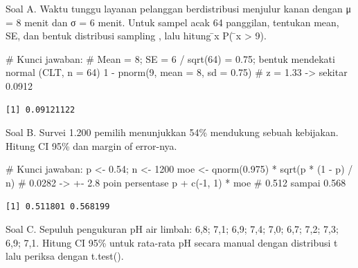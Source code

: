 \documentclass[
  indonesian,
  letterpaper,
]{book}
\newenvironment{Shaded}{\begin{snugshade}}{\end{snugshade}}
\newcommand{\AttributeTok}[1]{\textcolor[rgb]{0.40,0.45,0.13}{#1}}
\newcommand{\CommentTok}[1]{\textcolor[rgb]{0.37,0.37,0.37}{#1}}
\newcommand{\DecValTok}[1]{\textcolor[rgb]{0.68,0.00,0.00}{#1}}
\newcommand{\FloatTok}[1]{\textcolor[rgb]{0.68,0.00,0.00}{#1}}
\newcommand{\FunctionTok}[1]{\textcolor[rgb]{0.28,0.35,0.67}{#1}}
\newcommand{\NormalTok}[1]{\textcolor[rgb]{0.00,0.23,0.31}{#1}}
\newcommand{\OtherTok}[1]{\textcolor[rgb]{0.00,0.23,0.31}{#1}}
\newcommand{\SpecialCharTok}[1]{\textcolor[rgb]{0.37,0.37,0.37}{#1}}
\begin{document}
Soal A. Waktu tunggu layanan pelanggan berdistribusi menjulur kanan
dengan μ = 8 menit dan σ = 6 menit. Untuk sampel acak 64 panggilan,
tentukan mean, SE, dan bentuk distribusi sampling , lalu hitung ̄x P( ̄x
\textgreater{} 9).

\begin{Shaded}
\begin{Highlighting}[]
\CommentTok{\# Kunci jawaban:}
\CommentTok{\# Mean = 8; SE = 6 / sqrt(64) = 0.75; bentuk mendekati normal (CLT, n = 64)}
\DecValTok{1} \SpecialCharTok{{-}} \FunctionTok{pnorm}\NormalTok{(}\DecValTok{9}\NormalTok{, }\AttributeTok{mean =} \DecValTok{8}\NormalTok{, }\AttributeTok{sd =} \FloatTok{0.75}\NormalTok{) }\CommentTok{\# z = 1.33 {-}\textgreater{} sekitar 0.0912}
\end{Highlighting}
\end{Shaded}

\begin{verbatim}
[1] 0.09121122
\end{verbatim}

Soal B. Survei 1.200 pemilih menunjukkan 54\% mendukung sebuah
kebijakan. Hitung CI 95\% dan margin of error-nya.

\begin{Shaded}
\begin{Highlighting}[]
\CommentTok{\# Kunci jawaban:}
\NormalTok{p }\OtherTok{\textless{}{-}} \FloatTok{0.54}\NormalTok{; n }\OtherTok{\textless{}{-}} \DecValTok{1200}
\NormalTok{moe }\OtherTok{\textless{}{-}} \FunctionTok{qnorm}\NormalTok{(}\FloatTok{0.975}\NormalTok{) }\SpecialCharTok{*} \FunctionTok{sqrt}\NormalTok{(p }\SpecialCharTok{*}\NormalTok{ (}\DecValTok{1} \SpecialCharTok{{-}}\NormalTok{ p) }\SpecialCharTok{/}\NormalTok{ n) }\CommentTok{\# 0.0282 {-}\textgreater{} +{-} 2.8 poin persentase}
\NormalTok{p }\SpecialCharTok{+} \FunctionTok{c}\NormalTok{(}\SpecialCharTok{{-}}\DecValTok{1}\NormalTok{, }\DecValTok{1}\NormalTok{) }\SpecialCharTok{*}\NormalTok{ moe }\CommentTok{\# 0.512 sampai 0.568}
\end{Highlighting}
\end{Shaded}

\begin{verbatim}
[1] 0.511801 0.568199
\end{verbatim}

Soal C. Sepuluh pengukuran pH air limbah: 6,8; 7,1; 6,9; 7,4; 7,0; 6,7;
7,2; 7,3; 6,9; 7,1. Hitung CI 95\% untuk rata-rata pH secara manual
dengan distribusi t lalu periksa dengan t.test().
\end{document}
